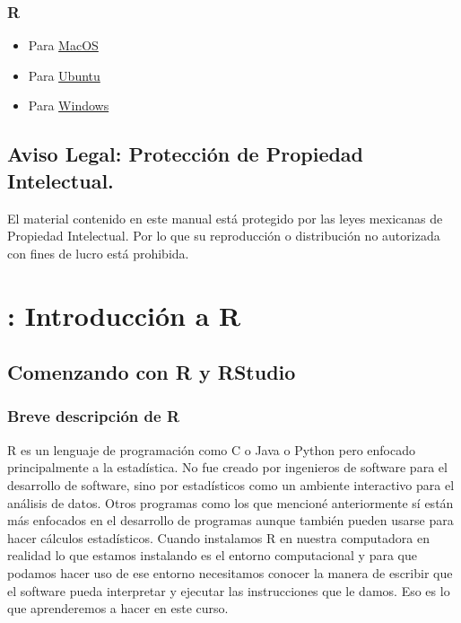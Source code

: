 \documentclass[
]{book}
\providecommand{\tightlist}{%
  \setlength{\itemsep}{0pt}\setlength{\parskip}{0pt}}
\begin{document}
\subsection{R}\label{r}

\begin{itemize}
\tightlist
\item
  Para \href{https://cran.r-project.org/bin/macosx/}{MacOS}
\item
  Para \href{https://cran.r-project.org/bin/linux/ubuntu/}{Ubuntu}
\item
  Para \href{https://cran.r-project.org/bin/windows/base/}{Windows}
\end{itemize}

\section{Aviso Legal: Protección de Propiedad Intelectual.}\label{aviso-legal-protecciuxf3n-de-propiedad-intelectual.}

El material contenido en este manual está protegido por las leyes mexicanas de Propiedad Intelectual. Por lo que su reproducción o distribución no autorizada con fines de lucro está prohibida.

\chapter{: Introducción a R}\label{introducciuxf3n-a-r}

\section{Comenzando con R y RStudio}\label{getting-started}

\subsection{Breve descripción de R}\label{breve-descripciuxf3n-de-r}

R es un lenguaje de programación como C o Java o Python pero enfocado principalmente a la estadística.
No fue creado por ingenieros de software para el desarrollo de software, sino por estadísticos como un ambiente interactivo para el análisis de datos.
Otros programas como los que mencioné anteriormente sí están más enfocados en el desarrollo de programas aunque también pueden usarse para hacer cálculos estadísticos.
Cuando instalamos R en nuestra computadora en realidad lo que estamos instalando es el entorno computacional y para que podamos hacer uso de ese entorno necesitamos conocer la manera de escribir que el software pueda interpretar y ejecutar las instrucciones que le damos.
Eso es lo que aprenderemos a hacer en este curso.
\end{document}
